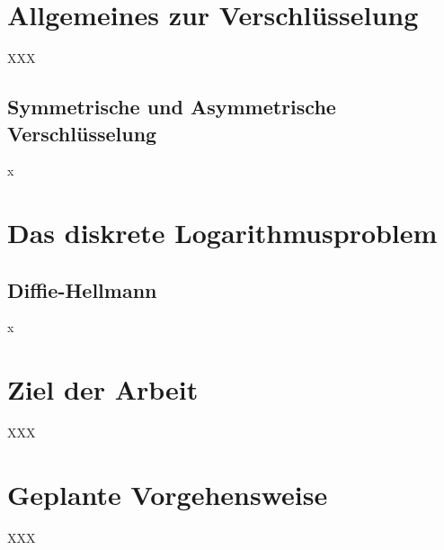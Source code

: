 \section{Allgemeines zur Verschlüsselung}
XXX

\subsection{Symmetrische und Asymmetrische Verschlüsselung}
x

\section{Das diskrete Logarithmusproblem}


\subsection{Diffie-Hellmann}
x


\section{Ziel der Arbeit}
XXX


\section{Geplante Vorgehensweise}
XXX